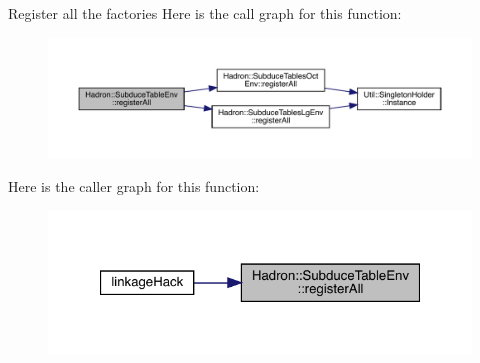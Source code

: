 Register all the factories Here is the call graph for this function\+:\nopagebreak
\begin{figure}[H]
\begin{center}
\leavevmode
\includegraphics[width=350pt]{dd/da5/namespaceHadron_1_1SubduceTableEnv_a168dd05273b8d8f0ca1cfb57fbe63e23_cgraph}
\end{center}
\end{figure}
Here is the caller graph for this function\+:\nopagebreak
\begin{figure}[H]
\begin{center}
\leavevmode
\includegraphics[width=321pt]{dd/da5/namespaceHadron_1_1SubduceTableEnv_a168dd05273b8d8f0ca1cfb57fbe63e23_icgraph}
\end{center}
\end{figure}
